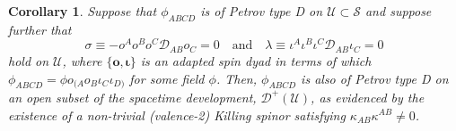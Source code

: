 \documentclass[10pt,a4paper]{article}
\theoremstyle{plain}
\newtheorem{corollary}{Corollary}
\def\bmo{{\bm o}}
\newcounter{mnotecount}%
\newcommand{\mnotex}[1]%
{\protect{\stepcounter{mnotecount}}$^{\mbox{\footnotesize $\bullet$\themnotecount}}$ 
\marginpar{%
\raggedright\tiny\em
$\!\!\!\!\!\!\,\bullet$\themnotecount: #1} }
\begin{document}

\begin{corollary}\label{Corollary:PetrovPropagation}
Suppose that $\phi_{ABCD}$ is of Petrov type D on $\mathcal{U}\subset\mathcal{S}$ and suppose further that 
\begin{equation} 
\sigma\equiv - o^A o^B o^C\mathcal{D}_{AB}o_C=0 \quad \text{and}\quad \lambda\equiv \iota^A\iota^B\iota^C\mathcal{D}_{AB}\iota_C=0\label{ShearConditions}
\end{equation}
hold on $\mathcal{U}$, where $\lbrace \bmo, \bm\iota\rbrace$ is an adapted spin dyad in terms of which $\phi_{ABCD}=\phi o_{(A}o_B\iota_C\iota_{D)}$ for some field $\phi$.
Then, $\phi_{ABCD}$ is also of Petrov type D on an open subset of the spacetime development, $\mathcal{D}^+(\mathcal{U})$, as evidenced by the existence of a non-trivial (valence-2) Killing spinor satisfying $\kappa_{AB}\kappa^{AB}\neq 0$. 
\end{corollary}
\end{document}
